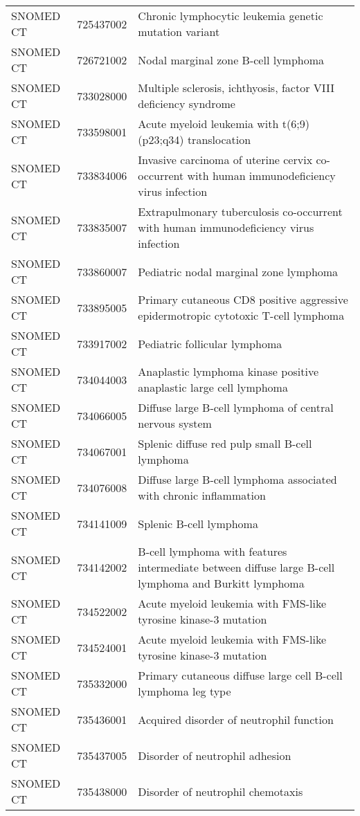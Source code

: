 \begin{table}[ht]
\begin{tabular}{lll}
  SNOMED CT & 725437002 & Chronic lymphocytic leukemia genetic mutation variant \\ 
  SNOMED CT & 726721002 & Nodal marginal zone B-cell lymphoma \\ 
  SNOMED CT & 733028000 & Multiple sclerosis, ichthyosis, factor VIII deficiency syndrome \\ 
  SNOMED CT & 733598001 & Acute myeloid leukemia with t(6;9)(p23;q34) translocation \\ 
  SNOMED CT & 733834006 & Invasive carcinoma of uterine cervix co-occurrent with human immunodeficiency virus infection \\ 
  SNOMED CT & 733835007 & Extrapulmonary tuberculosis co-occurrent with human immunodeficiency virus infection \\ 
  SNOMED CT & 733860007 & Pediatric nodal marginal zone lymphoma \\ 
  SNOMED CT & 733895005 & Primary cutaneous CD8 positive aggressive epidermotropic cytotoxic T-cell lymphoma \\ 
  SNOMED CT & 733917002 & Pediatric follicular lymphoma \\ 
  SNOMED CT & 734044003 & Anaplastic lymphoma kinase positive anaplastic large cell lymphoma \\ 
  SNOMED CT & 734066005 & Diffuse large B-cell lymphoma of central nervous system \\ 
  SNOMED CT & 734067001 & Splenic diffuse red pulp small B-cell lymphoma \\ 
  SNOMED CT & 734076008 & Diffuse large B-cell lymphoma associated with chronic inflammation \\ 
  SNOMED CT & 734141009 & Splenic B-cell lymphoma \\ 
  SNOMED CT & 734142002 & B-cell lymphoma with features intermediate between diffuse large B-cell lymphoma and Burkitt lymphoma \\ 
  SNOMED CT & 734522002 & Acute myeloid leukemia with FMS-like tyrosine kinase-3 mutation \\ 
  SNOMED CT & 734524001 & Acute myeloid leukemia with FMS-like tyrosine kinase-3 mutation \\ 
  SNOMED CT & 735332000 & Primary cutaneous diffuse large cell B-cell lymphoma leg type \\ 
  SNOMED CT & 735436001 & Acquired disorder of neutrophil function \\ 
  SNOMED CT & 735437005 & Disorder of neutrophil adhesion \\ 
  SNOMED CT & 735438000 & Disorder of neutrophil chemotaxis \\ 

\end{tabular}
\end{table}
